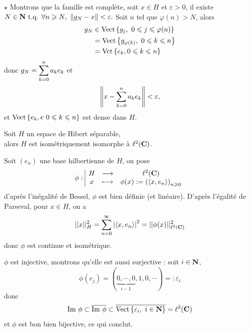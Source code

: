 \documentclass[a4paper,11pt, twoside]{article}
\begin{document}
\begin{Proof}
  $\star$ Montrons que la famille est complète, soit $x\in H$ et $\varepsilon>0$, il existe $N\in\N\tq \forall n\geqslant N,\ \norm{g_N-x}<\varepsilon.$ Soit $n$ tel que $\varphi(n)>N$, alors 
  \begin{align*}
    g_N&\in \mathrm{Vect}\left\{g_j,\ 0\leqslant j\leqslant \varphi(n)\right\}\\
    &= \mathrm{Vect}\left\{g_{\varphi(k)},\ 0\leqslant k\leqslant n\right\}\\
    &=\mathrm{Vct}\left\{e_k, 0\leqslant k\leqslant n\right\}
  \end{align*}
  donc $g_N=\displaystyle\sum_{k=0}^na_ke_k$ et 
  $$\left\lVert x-\sum_{k=0}^na_ke_k\right\rVert<\varepsilon,$$
  et $\mathrm{Vect}\left\{e_k,e\ 0\leqslant k\leqslant n\right\}$ est dense dans $H$.
\end{Proof}


\begin{Th}
  Soit $H$ un espace de Hibert séparable,\\

  alors $H$ est isométriquement isomorphe à $\ell^2(\mathbf C)$.
\end{Th}


\begin{Proof}
  Soit $(e_n)$ une base hilbertienne de $H$, on pose
  $$\phi:\begin{array}{|ccc}
    H&\longrightarrow&\ell^2(\mathbf C)\\
    x&\longmapsto&\phi(x):=\left(\left\langle x,e_n \right\rangle\right)_{n\geqslant 0}
  \end{array}$$
  d'après l'inégalité de Bessel, $\phi$ est bien définie (et linéaire).
  D'après l'égalité de Parseval, pour $x\in H$, on a
  $$||x||_{H}^2=\sum_{n=0}^\infty\left| \left\langle x,e_n \right\rangle\right|^2=||\phi(x)||_{\ell^2(\mathbf C)}^2$$
  donc $\phi$ est continue et isométrique.

  $\phi$ est injective, montrons qu'elle est aussi surjective : soit $i\in \mathbf N$, 
  $$\phi(e_j)=(\underbrace{0,\cdots,0}_{i-1},1,0,\cdots)=:\varepsilon_i$$
  donc 
  $$\mathrm{Im}\ \phi\subset\overline{\mathrm{Im}\ \phi}\subset\overline{\mathrm{Vect}\ens{\varepsilon_i,\ i\in\N}}=\ell^2(\C)$$
  et $\phi$ est bon bien bijective, ce qui conclut.
\end{Proof}
\end{document}
